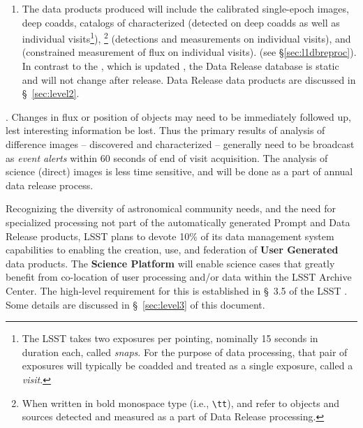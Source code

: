 \documentclass[SE,lsstdraft,toc]{lsstdoc}
\renewcommand{\DR}{{Data Release database}\xspace}
\begin{document}
\begin{enumerate}
\item {}
    The data products produced will include the calibrated single-epoch images, deep coadds, catalogs of characterized \Objects (detected on deep coadds as well as individual visits\footnote{The LSST takes two exposures per pointing, nominally 15 seconds in duration each, called \emph{snaps}. For the purpose of data processing, that pair of exposures will typically be coadded and treated as a single exposure, called a \emph{visit}.}), \Sources\footnote{When written in bold monospace type (i.e., \texttt{\textbackslash{}tt}), \Objects and \Sources refer to objects and sources detected and measured as a part of Data Release processing.} (detections and measurements on individual visits), and \ForcedSources (constrained measurement of flux on individual visits).  (see \S \ref{sec:l1dbreproc}). In contrast to the  \PPDB, which is updated  , the \DR is static and will not change after release. Data Release data products are discussed in \S~\ref{sec:level2}.

\end{enumerate}


 . Changes in flux or position of objects may need to be immediately followed up, lest interesting information be lost. Thus the primary results of analysis of difference images -- discovered and characterized \DIASources{} -- generally need to be broadcast as \emph{event alerts} within 60 seconds of end of visit acquisition. The analysis of science (direct) images is less time sensitive, and will be done as a part of annual data release process.

Recognizing the diversity of astronomical community needs, and the need for specialized processing not part of the automatically generated Prompt and Data Release products, LSST plans to devote 10\% of its data management system capabilities to enabling the creation, use, and federation of \textbf{User Generated} data products. The \textbf{Science Platform}  will enable science cases that greatly benefit from co-location of user processing and/or data within the LSST Archive Center. The high-level requirement for this is established in \S~3.5 of the LSST \SRD. Some  details are discussed in \S~\ref{sec:level3} of this document.
\end{document}
